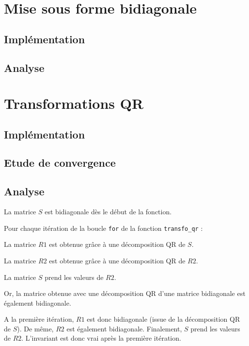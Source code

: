 \documentclass{article}
\begin{document}
\section{Mise sous forme bidiagonale}
\label{sec:forme_bidiag_}

\subsection{Implémentation}
\label{ssec:implem_bidiag_}

\subsection{Analyse}
\label{ssec:analyse_bidiag}


\section{Transformations QR}
\label{sec:transfo_qr}

\subsection{Implémentation}
\label{ssec:implem_qr}

\subsection{Etude de convergence}
\label{ssec:conv_qr}

\subsection{Analyse}
\label{ssec:analyse_qr}

La matrice $S$ est bidiagonale dès le début de la fonction.

Pour chaque itération de la boucle \verb|for| de la fonction \verb|transfo_qr| :
\smallskip

\noindent La matrice $R1$ est obtenue grâce à une décomposition QR de $S$.

\noindent La matrice $R2$ est obtenue grâce à une décomposition QR de $R2$.

\noindent La matrice $S$ prend les valeurs de $R2$.

\smallskip
Or, la matrice obtenue avec une décomposition QR d'une matrice bidiagonale est également bidiagonale. %

A la première itération, $R1$ est donc bidiagonale (issue de la décomposition QR de $S$). De même, $R2$ est également bidiagonale. Finalement, $S$ prend les valeurs de $R2$. L'invariant est donc vrai après la première itération.
\end{document}
